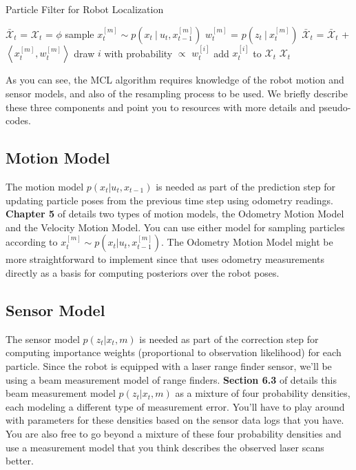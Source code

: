 \documentclass[12pt, a4paper]{article}
\begin{document}
\begin{algorithm}[!t]
\caption{Particle Filter for Robot Localization}\label{algo:mclAlgo}
\begin{algorithmic}[1]
\State $\bar{\mathcal{X}}_t$ = ${\mathcal{X}}_t$ = $\phi$
	\State sample $x^{[m]}_t\sim p(x_t\ |\ u_t,x^{[m]}_{t-1})$
	\State $w^{[m]}_t$ = $ p(z_t\ |\ x^{[m]}_{t})$
	\State $\bar{\mathcal{X}}_t$ = $\bar{\mathcal{X}}_t$ + $\left<x^{[m]}_t, w^{[m]}_t\right>$
\EndFor
{}
	\State draw $i$ with probability $\propto$ $w^{[i]}_t$
	\State add $x^{[i]}_t$ to ${\mathcal{X}}_t$
\EndFor
\State \Return ${\mathcal{X}}_t$
\end{algorithmic}
\end{algorithm}

As you can see, the MCL algorithm requires knowledge of the robot
motion and sensor models, and also of the resampling process to be
used. We briefly describe these three components and point you to
resources with more details and pseudo-codes.

\subsection*{Motion Model}

The motion model $p(x_t|u_t,x_{t-1})$ is needed as part of the prediction
step for updating particle poses from the previous time step using
odometry readings. \textbf{Chapter 5 }of \cite{thrun2005probabilistic}
details two types of motion models, the Odometry Motion Model and
the Velocity Motion Model. You can use either model for sampling particles
according to $x^{[m]}_t\sim p(x_t|u_t,x^{[m]}_{t-1})$. The Odometry
Motion Model might be more straightforward to implement since that
uses odometry measurements directly as a basis for computing posteriors
over the robot poses. 

\subsection*{Sensor Model}

The sensor model $p(z_t|x_t,m)$ is needed as part of the correction
step for computing importance weights (proportional to observation
likelihood) for each particle. Since the robot is equipped with a
laser range finder sensor, we'll be using a beam measurement model
of range finders. \textbf{Section 6.3 }of \cite{thrun2005probabilistic}
details this beam measurement model $p(z_t|x_t,m)$ as a mixture of
four probability densities, each modeling a different type of measurement
error. You'll have to play around with parameters for these densities
based on the sensor data logs that you have. You are also free to
go beyond a mixture of these four probability densities and use a
measurement model that you think describes the observed laser scans
better.
\end{document}
